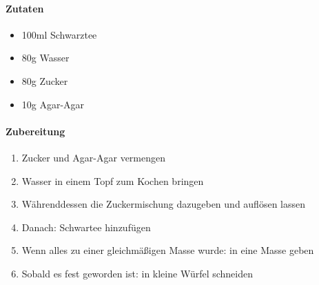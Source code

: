 \newpage
{}
\paragraph{Zutaten}
\begin{itemize}[noitemsep]
	\item 100ml Schwarztee
	\item 80g Wasser
	\item 80g Zucker
	\item 10g Agar-Agar
\end{itemize}


\paragraph{Zubereitung}
\begin{enumerate}[noitemsep]
	\item Zucker und Agar-Agar vermengen
	\item Wasser in einem Topf zum Kochen bringen
	\item Währenddessen die Zuckermischung dazugeben und auflösen lassen
	\item Danach: Schwartee hinzufügen
	\item Wenn alles zu einer gleichmäßigen Masse wurde: in eine Masse geben
	\item Sobald es fest geworden ist: in kleine Würfel schneiden
\end{enumerate}